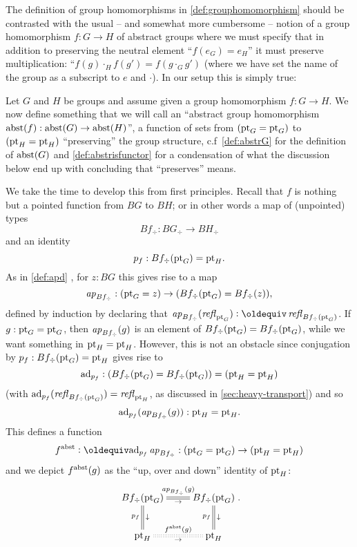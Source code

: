 The definition of group homomorphisms in \cref{def:grouphomomorphism} should be contrasted with the usual -- and somewhat more cumbersome -- notion of a group homomorphism $f\colon G\to H$ of abstract groups where we must specify that in addition to preserving the neutral element ``$f(e_G)=e_H$'' it must preserve multiplication: ``$f(g)\cdot_H f(g')=f(g\cdot_G g')$ (where we have set the name of the group as a subscript to $e$ and $\cdot$).  In our setup this is simply true:

\begin{definition}\label{def:grouphomomaxioms}
Let $G$ and $H$ be groups and assume given a group homomorphism $f:G\to H$.  We now define something that we will call an ``abstract group homomorphism 
${\mathrm{abst}}(f):\mathrm{abst}(G)\to \mathrm{abst}(H)$'', \ie a function of sets from $({\mathord{\mathrm{pt}}}_G={\mathord{\mathrm{pt}}}_G)$ to $({\mathord{\mathrm{pt}}}_H={\mathord{\mathrm{pt}}}_H)$ ``preserving'' the group structure, c.f~\cref{def:abstrG} for the definition of $\mathrm{abst}(G)$ and \cref{def:abstrisfunctor} for a condensation of what the discussion below end up with concluding that ``preserves'' means.  

We take the time to develop this from first principles.
Recall that $f$ is nothing but a pointed function from $BG$ to $BH$; or in other words a map of (unpointed) types 
$$Bf_\div\colon BG_\div\to BH_\div$$ 
and an identity 
$$p_f: Bf_\div({\mathord{\mathrm{pt}}}_G)={\mathord{\mathrm{pt}}}_H.$$  
As in \cref{def:apd}%
, for $z:BG$ this gives rise to a map 
$$\mathop{{\it ap}_{Bf_\div}}:({\mathord{\mathrm{pt}}}_G=z)\to (Bf_\div({\mathord{\mathrm{pt}}}_G)=Bf_\div(z)),$$ 
defined by induction by declaring that $\ap{Bf_\div}(\refl{\pt_G})\defequi \refl{Bf_\div(\pt_G)}$.  
If $g:{\mathord{\mathrm{pt}}}_G={\mathord{\mathrm{pt}}}_G$, then $\mathop{{\it ap}_{Bf_\div}}(g)$ is an element of $Bf_\div({\mathord{\mathrm{pt}}}_G)=Bf_\div({\mathord{\mathrm{pt}}}_G)$, while we want something in ${\mathord{\mathrm{pt}}}_H={\mathord{\mathrm{pt}}}_H$.  However, this is not an obstacle since conjugation by $p_f: Bf_\div({\mathord{\mathrm{pt}}}_G)={\mathord{\mathrm{pt}}}_H$ gives rise to 
$$\mathrm{ad}_{p_f}:(Bf_\div({\mathord{\mathrm{pt}}}_G)=Bf_\div({\mathord{\mathrm{pt}}}_G))=({\mathord{\mathrm{pt}}}_H={\mathord{\mathrm{pt}}}_H)$$ (with $\mathrm{ad}_{p_f}(\mathop{{\it refl}_{Bf_\div({\mathord{\mathrm{pt}}}_G)}})=\mathop{{\it refl}_{{\mathord{\mathrm{pt}}}_H}}$, as discussed in \cref{sec:heavy-transport}) and so 
$$\mathrm{ad}_{p_f}(\mathop{{\it ap}_{Bf_\div}}(g)):{\mathord{\mathrm{pt}}}_H={\mathord{\mathrm{pt}}}_H.$$
This defines a function
$$f^\abstr\defequi \mathrm{ad}_{p_f}\ap{Bf_\div}:(\pt_G=\pt_G)\to(\pt_H=\pt_H)$$  
and we depict $f^{\mathrm{abst}}(g)$ as the ``up, over and down'' identity of ${\mathord{\mathrm{pt}}}_H$:
$$\xymatrix{Bf_\div(\pt_G)\ar@{=}[r]^{\ap{Bf_\div}(g)}_\to\ar@{=}[d]^\downarrow_{p_f}&Bf_\div(\pt_G)\ar@{=}[d]^\downarrow_{p_f}\\
\pt_H\ar@{:}[r]^{f^\abstr(g)}_\to&\pt_H}.$$



\end{definition}
